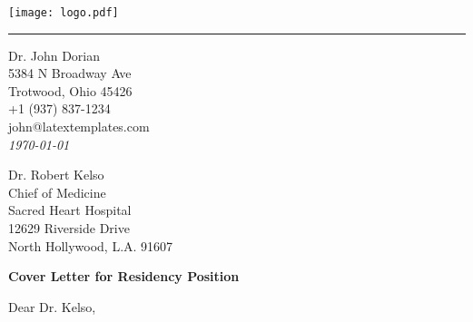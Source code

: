 \documentclass[
	12pt, %
]{letter}
\begin{document}

\vspace*{-1.25cm} %

\hfill\texttt{[image: logo.pdf]} %

\vspace{-0.5cm} %

\rule{\linewidth}{1pt} %

\medskip %


\begingroup
	\raggedleft %
	\small %
	Dr. John Dorian \\ %
	5384 N Broadway Ave \\ %
	Trotwood, Ohio 45426 \\
	+1 (937) 837-1234 \\ %
	john@latextemplates.com\\ %
	\bigskip %
	{\normalsize\textit{\today}}\\ %
\endgroup


\begingroup
	Dr. Robert Kelso \\
	Chief of Medicine \\
	Sacred Heart Hospital \\
	12629 Riverside Drive \\
	North Hollywood, L.A. 91607
\endgroup

\bigskip %

\textbf{Cover Letter for Residency Position}

\medskip %

Dear Dr. Kelso,

\smallskip %
\end{document}
